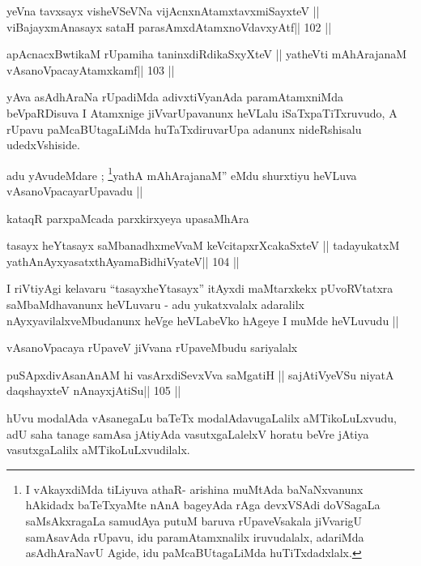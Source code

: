 \begin{shl}
yeVna tavxsayx visheVSeVNa vijAcnxnAtamxtavxmiSayxteV ||
viBajayxmAnasayx sataH parasAmxdAtamxnoV\s davxyAtf\hfill || 102 ||
\end{shl}

\begin{shl}
apAcnacxBwtikaM rUpamiha taninxdiRdikaSxyXteV ||
yatheVti mAhArajanaM vAsanoVpacayAtamxkamf\hfill || 103 ||
\end{shl}

\begin{artha}
yAva asAdhAraNa rUpadiMda adivxtiVyanAda paramAtamxniMda beVpaRDisuva
I Atamxnige jiVvarUpavanunx heVLalu iSaTxpaTiTxruvudo, A rUpavu
paMcaBUtagaLiMda huTaTxdiruvarUpa adanunx nideRshisalu udedxVshiside.
\end{artha}

\begin{artha}
adu yAvudeMdare ; \footnote[1]{I vAkayxdiMda tiLiyuva athaR- arishina
  muMtAda baNaNxvanunx hAkidadx baTeTxyaMte nAnA bageyAda rAga
  devxVSAdi doVSagaLa saMsAkxragaLa samudAya putuM baruva
  rUpaveVsakala jiVvarigU samAsavAda rUpavu, idu paramAtamxnalilx
  iruvudalalx, adariMda asAdhAraNavU Agide, idu paMcaBUtagaLiMda huTiTxdadxlalx.}yathA mAhArajanaM'' eMdu shurxtiyu
heVLuva vAsanoVpacayarUpavadu ||
\end{artha}

\medskip
{\centerline{kataqR parxpaMcada parxkirxyeya upasaMhAra}}

\begin{shl}
tasayx heYtasayx saMbanadhxmeVvaM keVcitapxrXcakaSxteV ||
tadayukatxM yathA\s nAyxyasatxthA\s yamaBidhiVyateV\hfill || 104 ||
\end{shl}

\begin{artha}
I riVtiyAgi kelavaru ``tasayxheYtasayx'' itAyxdi maMtarxkekx
pUvoRVtatxra saMbaMdhavanunx heVLuvaru - adu yukatxvalalx adaralilx
nAyxyavilalxveMbudanunx heVge heVLabeVko hAgeye I muMde heVLuvudu ||

vAsanoVpacaya rUpaveV jiVvana rUpaveMbudu sariyalalx
\end{artha}

\begin{shl}
puSApxdivAsanAnAM hi vasArxdiSevxVva saMgatiH ||
sajAtiVyeVSu niyatA daqshayxteV nAnayxjAtiSu\hfill || 105 ||
\end{shl}

\begin{artha}
hUvu modalAda vAsanegaLu baTeTx modalAdavugaLalilx aMTikoLuLxvudu, adU
saha tanage samAsa jAtiyAda vasutxgaLalelxV horatu beVre jAtiya
vasutxgaLalilx aMTikoLuLxvudilalx.
\end{artha}

